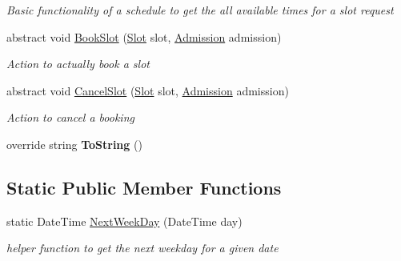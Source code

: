 \begin{DoxyCompactItemize}
\begin{DoxyCompactList}\small\item\em Basic functionality of a schedule to get the all available times for a slot request \end{DoxyCompactList}\item 
abstract void \hyperlink{class_general_health_care_elements_1_1_booking_models_1_1_entity_waiting_list_schedule_afe7744ce4393efeb27fbdd0194ce5116}{Book\+Slot} (\hyperlink{class_general_health_care_elements_1_1_booking_models_1_1_slot}{Slot} slot, \hyperlink{class_general_health_care_elements_1_1_treatment_admission_types_1_1_admission}{Admission} admission)
\begin{DoxyCompactList}\small\item\em Action to actually book a slot \end{DoxyCompactList}\item 
abstract void \hyperlink{class_general_health_care_elements_1_1_booking_models_1_1_entity_waiting_list_schedule_aa034b6696be8b48b739006d7a7c7f315}{Cancel\+Slot} (\hyperlink{class_general_health_care_elements_1_1_booking_models_1_1_slot}{Slot} slot, \hyperlink{class_general_health_care_elements_1_1_treatment_admission_types_1_1_admission}{Admission} admission)
\begin{DoxyCompactList}\small\item\em Action to cancel a booking \end{DoxyCompactList}\item 
override string {\bfseries To\+String} ()\hypertarget{class_general_health_care_elements_1_1_booking_models_1_1_entity_waiting_list_schedule_a76e3e1981efd30137b3d9cfdf4602511}{}\label{class_general_health_care_elements_1_1_booking_models_1_1_entity_waiting_list_schedule_a76e3e1981efd30137b3d9cfdf4602511}

\end{DoxyCompactItemize}
\subsection*{Static Public Member Functions}
\begin{DoxyCompactItemize}
\item 
static Date\+Time \hyperlink{class_general_health_care_elements_1_1_booking_models_1_1_entity_waiting_list_schedule_ab4aca2fc76c09ec514c09818fba5de9f}{Next\+Week\+Day} (Date\+Time day)
\begin{DoxyCompactList}\small\item\em helper function to get the next weekday for a given date \end{DoxyCompactList}\end{DoxyCompactItemize}
